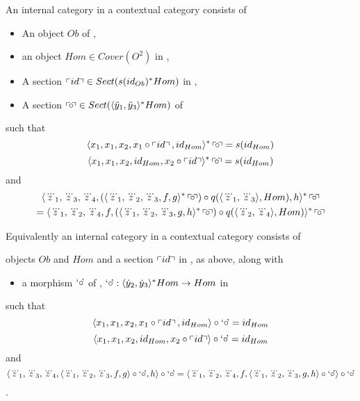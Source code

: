 \begin{lemma}
\label{internalcategorylemma}
An internal category in a contextual category \catcw consists of
\begin{itemize}
\item An object $Ob$ of \catc,
\item an object $Hom \in Cover(O^2)$ in \catc,
\item A section $\left\ulcorner id\right\urcorner \in Sect(s(id_{Ob})^*Hom)$ in \catc, 
\item A section $\left\ulcorner\kern-2pt\circ \kern-2pt\right\urcorner \in Sect(\langle\ddot y_1,\ddot y_3\rangle^*Hom) $ of \catc \\ 
													
\end{itemize}
such that
\begin{equation}
\label{leftidentityaxiom}
\leftidentitymapped
\end{equation}
\begin{equation}
\label{rightidentityaxiom}
\rightidentitymapped
\end{equation}
and
\begin{multline}
\label{associativityaxiom}
\assoclhsremapped\\
            = \assocrhsremapped
\end{multline}


Equivalently an internal category in a contextual category \catcw consists of
\item objects $Ob$ and  $Hom$  and a section $\left\ulcorner id\right\urcorner$ in \catc,  as above, along with
\begin{itemize}
\item a morphism $\text{`$\circ$\kern-2pt'}$ of \catc, $\text{`$\circ$\kern-2pt'}: \langle\dot y_2,\dot y_3\rangle^*Hom \rightarrow Hom$ in \catc
\end{itemize}
such that
\begin{equation}
\label{leftidentityrepresentation2}
\tuple{x_1,x_1,x_2,x_1\circ \fid,id_{Hom}} \circ \compmorph =id_{Hom}
\end{equation}
\begin{equation}
\label{rightidentityrepresentation2}
\tuple{x_1,x_1,x_2,id_{Hom},x_2 \circ \fid} \circ \compmorph =id_{Hom}
\end{equation}
and
\begin{equation}
\label{associativityrepresentation2}
\assocequivalentlhs = \assocequivalentrhs
\end{equation}.
\end{lemma}
